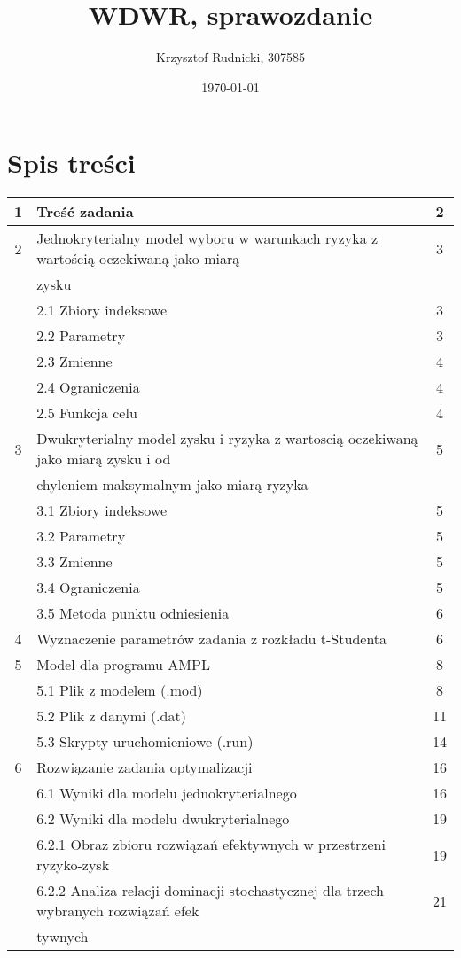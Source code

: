 \documentclass[12pt]{article}
\title{WDWR, sprawozdanie}
\author{Krzysztof Rudnicki, 307585}
\date{\today}
\begin{document}
\maketitle

\section*{Spis treści}
\begin{longtable}{|c|l|c|}
\hline
1 & Treść zadania & 2 \\
\hline
2 & Jednokryterialny model wyboru w warunkach ryzyka z wartością oczekiwaną jako miarą & 3 \\
  & zysku & \\
  & 2.1 Zbiory indeksowe & 3 \\
  & 2.2 Parametry & 3 \\
  & 2.3 Zmienne & 4 \\
  & 2.4 Ograniczenia & 4 \\
  & 2.5 Funkcja celu & 4 \\
\hline
3 & Dwukryterialny model zysku i ryzyka z wartoscią oczekiwaną jako miarą zysku i od & 5 \\
  & chyleniem maksymalnym jako miarą ryzyka & \\
  & 3.1 Zbiory indeksowe & 5 \\
  & 3.2 Parametry & 5 \\
  & 3.3 Zmienne & 5 \\
  & 3.4 Ograniczenia & 5 \\
  & 3.5 Metoda punktu odniesienia & 6 \\
\hline
4 & Wyznaczenie parametrów zadania z rozkładu t-Studenta & 6 \\
\hline
5 & Model dla programu AMPL & 8 \\
  & 5.1 Plik z modelem (.mod) & 8 \\
  & 5.2 Plik z danymi (.dat) & 11 \\
  & 5.3 Skrypty uruchomieniowe (.run) & 14 \\
\hline
6 & Rozwiązanie zadania optymalizacji & 16 \\
  & 6.1 Wyniki dla modelu jednokryterialnego & 16 \\
  & 6.2 Wyniki dla modelu dwukryterialnego & 19 \\
  & 6.2.1 Obraz zbioru rozwiązań efektywnych w przestrzeni ryzyko-zysk & 19 \\
  & 6.2.2 Analiza relacji dominacji stochastycznej dla trzech wybranych rozwiązań efek & 21 \\
  & tywnych & \\
\hline
\end{longtable}
\end{document}
